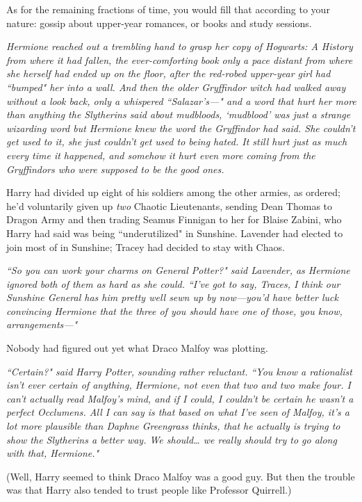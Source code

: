As for the remaining fractions of time, you would fill that according to your nature: gossip about upper-year romances, or books and study sessions.

\emph{Hermione reached out a trembling hand to grasp her copy of \emph{Hogwarts: A History} from where it had fallen, the ever-comforting book only a pace distant from where she herself had ended up on the floor, after the red-robed upper-year girl had ``bumped" her into a wall. And then the older Gryffindor witch had walked away without a look back, only a whispered \mbox{``Salazar's—"} and a word that hurt her more than anything the Slytherins said about mudbloods, `mudblood' was just a strange wizarding word but Hermione knew the word the Gryffindor had said. She couldn't get used to it, she just couldn't get used to being hated. It still hurt just as much every time it happened, and somehow it hurt even more coming from the Gryffindors who were \emph{supposed} to be the good ones.}

Harry had divided up eight of his soldiers among the other armies, as ordered; he'd voluntarily given up \emph{two} Chaotic Lieutenants, sending Dean Thomas to Dragon Army and then trading Seamus Finnigan to her for Blaise Zabini, who Harry had said was being ``underutilized" in Sunshine. Lavender had elected to join most of \SPHEW in Sunshine; Tracey had decided to stay with Chaos.

\emph{``So you can work your charms on General Potter?" said Lavender, as Hermione ignored both of them as hard as she could. ``I've got to say, Traces, I think our Sunshine General has him pretty well sewn up by now—you'd have better luck convincing Hermione that the three of you should have one of those, you know, arrangements—"}

Nobody had figured out yet what Draco Malfoy was plotting.

\emph{``Certain?" said Harry Potter, sounding rather reluctant. ``You know a rationalist isn't ever certain of anything, Hermione, not even that two and two make four. I can't actually read Malfoy's mind, and if I could, I couldn't be certain he wasn't a perfect Occlumens. All I can say is that based on what I've seen of Malfoy, it's a lot more plausible than Daphne Greengrass thinks, that he actually is trying to show the Slytherins a better way. We should{\ldots} we really should try to go along with that, Hermione."}

(Well, Harry seemed to think Draco Malfoy was a good guy. But then the trouble was that Harry also tended to trust people like Professor Quirrell.)

